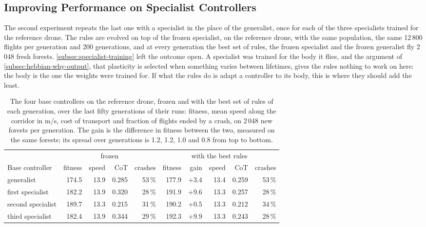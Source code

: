 \subsection{Improving Performance on Specialist Controllers}
\label{subsec:results-specialist}

The second experiment repeats the last one with a specialist in the place of the generalist, once for each of the three specialists trained for the reference drone. The rules are evolved on top of the frozen specialist, on the reference drone, with the same population, the same 12\,800 flights per generation and 200 generations, and at every generation the best set of rules, the frozen specialist and the frozen generalist fly 2\,048 fresh forests. \autoref{subsec:specialist-training} left the outcome open. A specialist was trained for the body it flies, and the argument of \autoref{subsec:hebbian-why-output}, that plasticity is selected when something varies between lifetimes, gives the rules nothing to work on here: the body is the one the weights were trained for. If what the rules do is adapt a controller to its body, this is where they should add the least.

\begin{table}[htbp]
\centering
\small
\begin{tabularx}{\textwidth}{>{\raggedright\arraybackslash}X r r r r r r r r r}
\hline
 & \multicolumn{4}{c}{frozen} & \multicolumn{5}{c}{with the best rules} \\
Base controller & fitness & speed & CoT & crashes & fitness & gain & speed & CoT & crashes \\
\hline
generalist & 174.5 & 13.9 & 0.285 & 53\,\% & 177.9 & +3.4 & 13.4 & 0.259 & 53\,\% \\
first specialist & 182.2 & 13.9 & 0.320 & 28\,\% & 191.9 & +9.6 & 13.3 & 0.257 & 28\,\% \\
second specialist & 189.7 & 13.3 & 0.215 & 31\,\% & 190.2 & +0.5 & 13.3 & 0.212 & 34\,\% \\
third specialist & 182.4 & 13.9 & 0.344 & 29\,\% & 192.3 & +9.9 & 13.3 & 0.243 & 28\,\% \\
\hline
\end{tabularx}
\caption[The four base controllers on the reference drone, frozen and with the best rules]{The four base controllers on the reference drone, frozen and with the best set of rules of each generation, over the last fifty generations of their runs: fitness, mean speed along the corridor in m/s, cost of transport and fraction of flights ended by a crash, on 2\,048 new forests per generation. The gain is the difference in fitness between the two, measured on the same forests; its spread over generations is 1.2, 1.2, 1.0 and 0.8 from top to bottom.}
\label{tab:inner-loop-bases}
\end{table}

